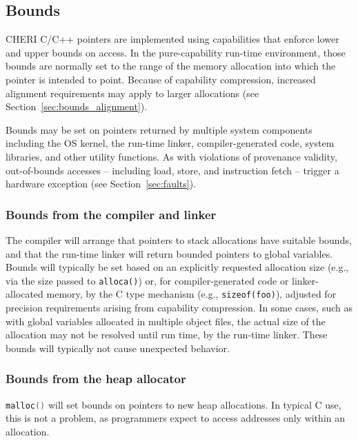 \documentclass[11pt]{article}
\newcommand{\ccode}[1]{\lstinline[language={C},basicstyle=\small\ttfamily]{#1}}
\newcommand{\cfunc}[1]{\ccode{#1()}}
\begin{document}
\subsection{Bounds}

CHERI C/C++ pointers are implemented using capabilities that enforce lower and
upper bounds on access.
In the pure-capability run-time environment, those bounds are normally set to
the range of the memory allocation into which the pointer is intended to
point.
Because of capability compression, increased alignment requirements may apply
to larger allocations (see Section~\ref{sec:bounds_alignment}).

Bounds may be set on pointers returned by multiple system components including
the OS kernel, the run-time linker, compiler-generated code, system libraries,
and other utility functions.
As with violations of provenance validity, out-of-bounds accesses -- including
load, store, and instruction fetch -- trigger a hardware exception (see
Section~\ref{sec:faults}).

\subsubsection{Bounds from the compiler and linker}

The compiler will arrange that pointers to stack allocations have suitable
bounds, and that the run-time linker will return bounded pointers to global
variables.
Bounds will typically be set based on an explicitly requested allocation size
(e.g., via the size passed to \texttt{alloca()}) or, for compiler-generated
code or linker-allocated memory, by the C type mechanism (e.g.,
\texttt{sizeof(foo)}), adjusted for precision requirements arising from
capability compression.
In some cases, such as with global variables allocated in multiple object
files, the actual size of the allocation may not be resolved until run time,
by the run-time linker.
These bounds will typically not cause unexpected behavior.

\subsubsection{Bounds from the heap allocator}

\cfunc{malloc} will set bounds on pointers to new heap allocations.
In typical C use, this is not a problem, as programmers expect to access
addresses only within an allocation.
\end{document}
